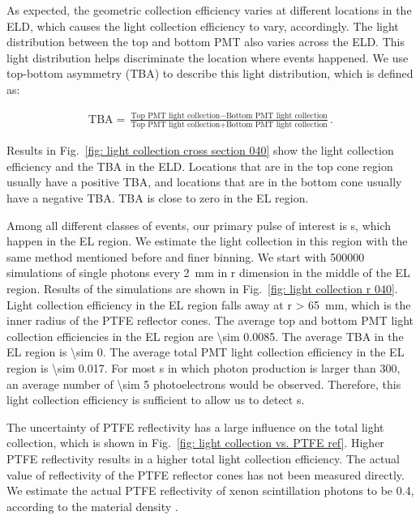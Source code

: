 As expected, the geometric collection efficiency varies at different locations in the ELD, which causes the light collection efficiency to vary, accordingly. %
The light distribution between the top and bottom PMT also varies across the ELD. This light distribution helps discriminate the location where events happened. We use top-bottom asymmetry (TBA) to describe this light distribution, which is defined as: 

\begin{align}
	\text{TBA} = \frac{\text{Top PMT light collection}-\text{Bottom PMT light collection}}{\text{Top PMT light collection}+\text{Bottom PMT light collection}}.
\end{align}

Results in Fig.~\ref{fig: light collection cross section 040} show the light collection efficiency and the TBA in the ELD. Locations that are in the top cone region usually have a positive TBA, and locations that are in the bottom cone usually have a negative TBA. TBA is close to zero in the EL region. 

Among all different classes of events, our primary pulse of interest is \eee s, which happen in the EL region. We estimate the light collection in this region with the same method mentioned before and finer binning. We start with \num{500000} simulations of single photons every \SI{2}{\mm} in r dimension in the middle of the EL region.  Results of the simulations are shown in Fig.~\ref{fig: light collection r 040}. Light collection efficiency in the EL region falls away at r \SI{> 65}{\mm}, which is the inner radius of the PTFE reflector cones. %
The average top and bottom PMT light collection efficiencies in the EL region are \num{\sim 0.0085}. The average TBA in the EL region is \num{\sim 0}. The average total PMT light collection efficiency in the EL region is \num{\sim 0.017}. For most \eee s in which photon production is larger than \num{300}, an average number of \num{\sim 5} photoelectrons would be observed. Therefore, this light collection efficiency is sufficient to allow us to detect \eee s.

The uncertainty of PTFE reflectivity has a large influence on the total light collection, %
which is shown in Fig.~\ref{fig: light collection vs. PTFE ref}. Higher PTFE reflectivity results in a higher total light collection efficiency. The actual value of reflectivity of the PTFE reflector cones has not been measured directly. We estimate the actual PTFE reflectivity of xenon scintillation photons to be \num{0.4}, according to the material density . 

